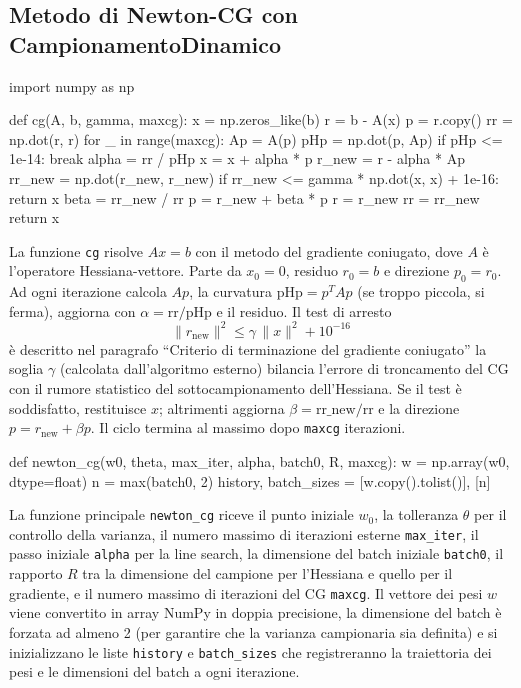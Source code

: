 \documentclass[a4paper,12pt]{article}
\begin{document}
\newpage


\subsection{Metodo di Newton-CG con Campionamento\newline Dinamico}

\begin{pythoncode}[title= Newton-CG]

import numpy as np

def cg(A, b, gamma, maxcg):
    x = np.zeros_like(b)
    r = b - A(x)
    p = r.copy()
    rr = np.dot(r, r)
    for _ in range(maxcg):
        Ap = A(p)
        pHp = np.dot(p, Ap)
        if pHp <= 1e-14:
            break
        alpha = rr / pHp
        x = x + alpha * p
        r_new = r - alpha * Ap
        rr_new = np.dot(r_new, r_new)
        if rr_new <= gamma * np.dot(x, x) + 1e-16:
            return x
        beta = rr_new / rr
        p = r_new + beta * p
        r = r_new
        rr = rr_new
    return x
\end{pythoncode}
La funzione \texttt{cg} risolve \(A x = b\) con il metodo del gradiente coniugato, dove \(A\) è l'operatore Hessiana-vettore. Parte da \(x_0=0\), residuo \(r_0=b\) e direzione \(p_0=r_0\). Ad ogni iterazione calcola \(Ap\), la curvatura \(\text{pHp}=p^T A p\) (se troppo piccola, si ferma), aggiorna con \(\alpha=\text{rr}/\text{pHp}\) e il residuo. Il test di arresto
\[
\|r_{\text{new}}\|^2 \le \gamma\,\|x\|^2 + 10^{-16}
\]
è descritto nel paragrafo ``Criterio di terminazione del gradiente coniugato'' la soglia \(\gamma\) (calcolata dall'algoritmo esterno) bilancia l'errore di troncamento del CG con il rumore statistico del sottocampionamento dell'Hessiana. Se il test è soddisfatto, restituisce \(x\); altrimenti aggiorna \(\beta = \text{rr\_new}/\text{rr}\) e la direzione \(p = r_{\text{new}} + \beta p\). Il ciclo termina al massimo dopo \texttt{maxcg} iterazioni.
\begin{pythoncode}[title= Newton-CG]

def newton_cg(w0, theta, max_iter, alpha, batch0, R, maxcg):
    w = np.array(w0, dtype=float)
    n = max(batch0, 2)
    history, batch_sizes = [w.copy().tolist()], [n]
\end{pythoncode}
La funzione principale \texttt{newton\_cg} riceve il punto iniziale \(w_0\), la tolleranza \(\theta\) per il controllo della varianza, il numero massimo di iterazioni esterne \texttt{max\_iter}, il passo iniziale \texttt{alpha} per la line search, la dimensione del batch iniziale \texttt{batch0}, il rapporto \(R\) tra la dimensione del campione per l'Hessiana e quello per il gradiente, e il numero massimo di iterazioni del CG \texttt{maxcg}. Il vettore dei pesi \(w\) viene convertito in array NumPy in doppia precisione, la dimensione del batch è forzata ad almeno 2 (per garantire che la varianza campionaria sia definita) e si inizializzano le liste \texttt{history} e \texttt{batch\_sizes} che registreranno la traiettoria dei pesi e le dimensioni del batch a ogni iterazione.
\end{document}
